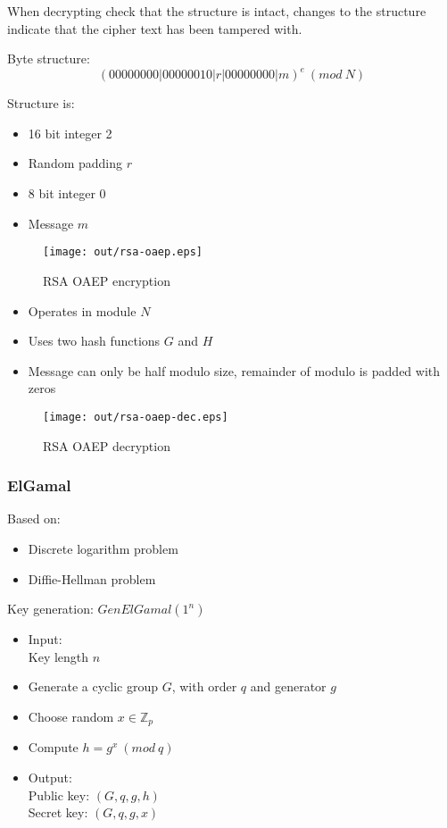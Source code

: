 \documentclass[a4paper]{article}
\begin{document}
When decrypting check that the structure is intact, changes to the structure
indicate that the cipher text has been tampered with.


Byte structure:
\[
  (00000000|00000010|r|00000000|m)^{e} \: (mod \: N)
\]

Structure is:
\begin{itemize}
  \item 16 bit integer 2
  \item Random padding $r$
  \item 8 bit integer 0
  \item Message $m$
\end{itemize}


\begin{figure}[h!]
  \centering
  \texttt{[image: out/rsa-oaep.eps]}
  \caption{RSA OAEP encryption}
  \label{fig:rsa-oaep}
\end{figure}
\FloatBarrier

\begin{itemize}
  \item Operates in module $N$
  \item Uses two hash functions $G$ and $H$
  \item Message can only be half modulo size, remainder of modulo is padded with
        zeros
\end{itemize}

\begin{figure}[h!]
  \centering
  \texttt{[image: out/rsa-oaep-dec.eps]}
  \caption{RSA OAEP decryption}
  \label{fig:rsa-oaep-dec}
\end{figure}
\FloatBarrier

\subsubsection{ElGamal}

Based on:
\begin{itemize}
  \item Discrete logarithm problem
  \item Diffie-Hellman problem
\end{itemize}

Key generation: $GenElGamal(1^{n})$
\begin{itemize}
  \item
    Input: \\
    Key length $n$
  \item Generate a cyclic group $G$, with order $q$ and generator $g$
  \item Choose random $x \in \mathbb{Z}_{p}$
  \item Compute $h = g^{x} \: (mod \: q)$
  \item
    Output: \\
    Public key: $(G, q, g, h)$ \\
    Secret key: $(G, q, g, x)$
\end{itemize}
\end{document}
